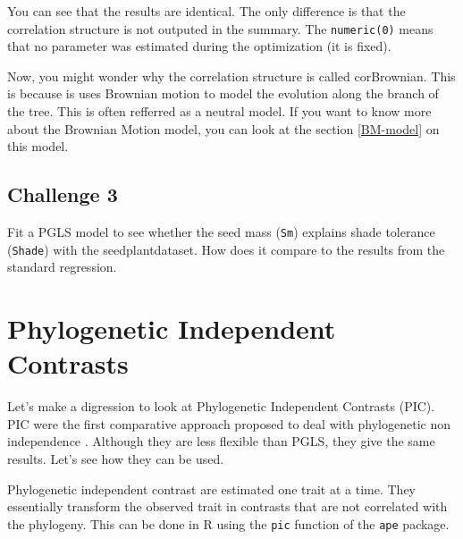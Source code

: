 \documentclass[
]{book}
\newenvironment{Shaded}{\begin{snugshade}}{\end{snugshade}}
\newcommand{\AttributeTok}[1]{\textcolor[rgb]{0.13,0.29,0.53}{#1}}
\newcommand{\CommentTok}[1]{\textcolor[rgb]{0.56,0.35,0.01}{\textit{#1}}}
\newcommand{\FunctionTok}[1]{\textcolor[rgb]{0.13,0.29,0.53}{\textbf{#1}}}
\newcommand{\NormalTok}[1]{#1}
\newcommand{\OtherTok}[1]{\textcolor[rgb]{0.56,0.35,0.01}{#1}}
\newcommand{\SpecialCharTok}[1]{\textcolor[rgb]{0.81,0.36,0.00}{\textbf{#1}}}
\begin{document}
You can see that the results are identical. The only difference is that the correlation structure is not outputed in the summary. The \texttt{numeric(0)} means that no parameter was estimated during the optimization (it is fixed).

Now, you might wonder why the correlation structure is called corBrownian. This is because is uses Brownian motion to model the evolution along the branch of the tree. This is often refferred as a neutral model. If you want to know more about the Brownian Motion model, you can look at the section \ref{BM-model} on this model.

\section{Challenge 3}\label{challenge-3}

Fit a PGLS model to see whether the seed mass (\texttt{Sm}) explains shade tolerance (\texttt{Shade}) with the seedplantdataset. How does it compare to the results from the standard regression.

\chapter{Phylogenetic Independent Contrasts}\label{pic}

Let's make a digression to look at Phylogenetic Independent Contrasts (PIC). PIC were the first comparative approach proposed to deal with phylogenetic non independence \citep{felsenstein1985phylogenies}. Although they are less flexible than PGLS, they give the same results. Let's see how they can be used.

Phylogenetic independent contrast are estimated one trait at a time. They essentially transform the observed trait in contrasts that are not correlated with the phylogeny. This can be done in R using the \texttt{pic} function of the \texttt{ape} package.

\begin{Shaded}
\end{Shaded}
\end{document}
